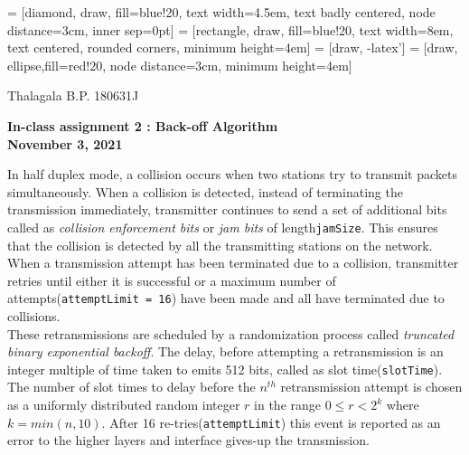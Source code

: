 \documentclass[a4paper,11pt]{article}
\begin{document}
	
	
 = [diamond, draw, fill=blue!20, 
text width=4.5em, text badly centered, node distance=3cm, inner sep=0pt]
 = [rectangle, draw, fill=blue!20, 
text width=8em, text centered, rounded corners, minimum height=4em]
 = [draw, -latex']
 = [draw, ellipse,fill=red!20, node distance=3cm,
minimum height=4em]
	
	Thalagala B.P. 180631J
\begin{center}	
{	\Large\textbf{In-class assignment 2 : Back-off Algorithm}}\\[2mm]	

\textbf{November 3, 2021}
\end{center}



In half duplex mode, a collision occurs when two stations try to transmit packets simultaneously. When a collision is detected, instead of terminating the transmission immediately, transmitter continues to send a set of additional bits called as \textit{collision enforcement bits} or \textit{jam bits} of length{\tt jamSize}. This ensures that the collision is detected by all the transmitting stations on the network. When a transmission attempt has been terminated due to a collision, transmitter retries until either it is successful or a maximum number of attempts({\tt attemptLimit = 16}) have been made and all have terminated due to collisions.\\ 

These retransmissions are scheduled by a randomization process called \textit{truncated binary exponential backoff}. The delay, before attempting a retransmission is an integer multiple of time taken to emits 512 bits, called as slot time({\tt slotTime}). The number of slot times to delay before the $n^{th}$ retransmission attempt is chosen as a uniformly distributed random integer $r$ in the range $0\leq r < 2^k$ where $k = min(n, 10)$. After 16 re-tries({\tt attemptLimit}) this event is reported as an error to the higher layers and interface gives-up the transmission.\\
\end{document}
